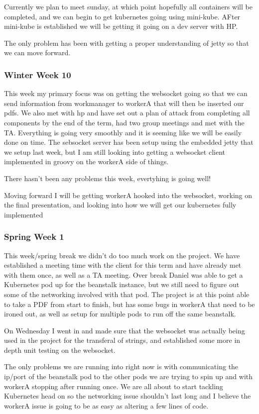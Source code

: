 \documentclass[onecolumn, draftclsnofoot,10pt, compsoc]{IEEEtran}
\begin{document}
Currently we plan to meet sunday, at which point hopefully all containers will be completed, and we can begin to get kubernetes going using mini-kube. AFter mini-kube is established we will be getting it going on a dev server with HP.

The only problem has been with getting a proper understanding of jetty so that we can move forward.

\subsubsection*{Winter Week 10}
This week my primary focus was on getting the websocket going so that we can send information from workmanager to workerA that will then be inserted our pdfs. We also met with hp and have set out a plan of attack from completing all components by the end of the term, had two group meetings and met with the TA. Everything is going very smoothly and it is seeming like we will be easily done on time. The sebsocket server has been setup using the embedded jetty that we setup last week, but I am still looking into getting a websocket client implemented in groovy on the workerA side of things.

There hasn't been any problems this week, evertyhing is going well!

Moving forward I will be getting workerA hooked into the websocket, working on the final presentation, and looking into how we will get our kubernetes fully implemented

\subsubsection*{Spring Week 1}
This week/spring break we didn't do too much work on the project. We have established a meeting time with the client for this term and have already met with them once, as well as a TA meeting. Over break Daniel was able to get a Kubernetes pod up for the beanstalk instance, but we still need to figure out some of the networking involved with that pod. The project is at this point able to take a PDF from start to finish, but has some bugs in workerA that need to be ironed out, as well as setup for multiple pods to run off the same beanstalk.

On Wednesday I went in and made sure that the websocket was actually being used in the project for the transferal of strings, and established some more in depth unit testing on the websocket.

The only problems we are running into right now is with communicating the ip/port of the beanstalk pod to the other pods we are trying to spin up and with workerA stopping after running once. We are all about to start tackling Kubernetes head on so the networking issue shouldn't last long and I believe the workerA issue is going to be as easy as altering a few lines of code.
\end{document}
